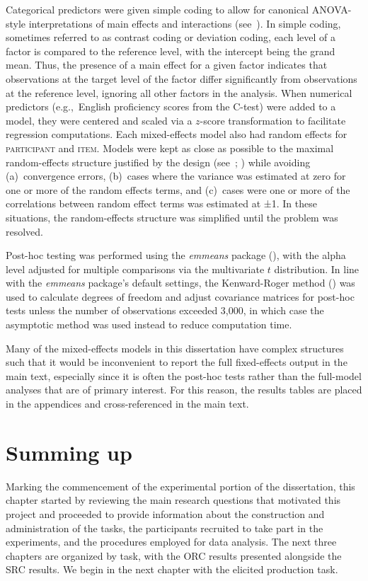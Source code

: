 Categorical predictors were given simple coding to allow for canonical ANOVA-style interpretations of main effects and interactions (see~\cite{barr2021}). In simple coding, sometimes referred to as contrast coding or deviation coding, each level of a factor is compared to the reference level, with the intercept being the grand mean. Thus, the presence of a main effect for a given factor indicates that observations at the target level of the factor differ significantly from observations at the reference level, ignoring all other factors in the analysis. When numerical predictors (e.g.,~English proficiency scores from the C-test) were added to a model, they were centered and scaled via a $z$-score transformation to facilitate regression computations. Each mixed-effects model also had random effects for \textsc{participant} and \textsc{item}. Models were kept as close as possible to the maximal random-effects structure justified by the design (see~\cite{barr2021}; \cite{barr.etal2013}) while avoiding (a)~convergence errors, (b)~cases where the variance was estimated at zero for one or more of the random effects terms, and (c)~cases were one or more of the correlations between random effect terms was estimated at ±1. In these situations, the random-effects structure was simplified until the problem was resolved.

Post-hoc testing was performed using the \textit{emmeans} package (\cite{lenth2022}), with the alpha level adjusted for multiple comparisons via the multivariate $t$ distribution. In line with the \textit{emmeans} package's default settings, the Kenward-Roger method (\cite{kenward.roger1997}) was used to calculate degrees of freedom and adjust covariance matrices for post-hoc tests unless the number of observations exceeded 3,000, in which case the asymptotic method was used instead to reduce computation time.

Many of the mixed-effects models in this dissertation have complex structures such that it would be inconvenient to report the full fixed-effects output in the main text, especially since it is often the post-hoc tests rather than the full-model analyses that are of primary interest. For this reason, the results tables are placed in the appendices and cross-referenced in the main text.

\section{Summing up}\label{stu-conclusion}

Marking the commencement of the experimental portion of the dissertation, this chapter started by reviewing the main research questions that motivated this project and proceeded to provide information about the construction and administration of the tasks, the participants recruited to take part in the experiments, and the procedures employed for data analysis. The next three chapters are organized by task, with the ORC results presented alongside the SRC results. We begin in the next chapter with the elicited production task.